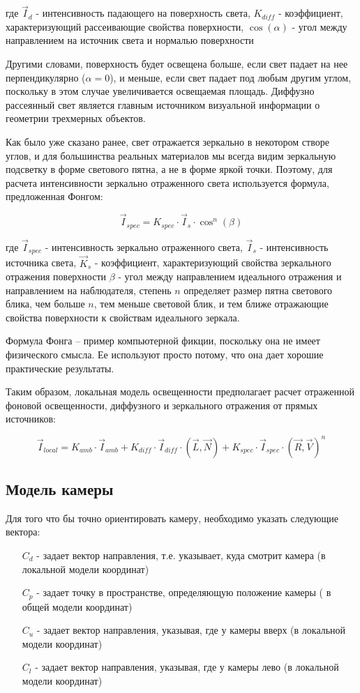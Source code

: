 \documentclass[12pt, a4paper]{article}
\begin{document}
где $\vec{I}_{d}$ - интенсивность падающего на поверхность света, $K_{diff}$ - коэффициент, характеризующий рассеивающие свойства поверхности, $\cos(\alpha)$ - угол между направлением на источник света и нормалью поверхности

Другими словами, поверхность будет освещена больше, если свет падает на нее перпендикулярно ($\alpha = 0$), и меньше, если свет падает под любым другим углом, поскольку в этом случае увеличивается освещаемая площадь. Диффузно рассеянный свет является главным источником визуальной информации о геометрии трехмерных объектов.

Как было уже сказано ранее, свет отражается зеркально в некотором створе углов, и для большинства реальных материалов мы всегда видим зеркальную подсветку в форме светового пятна, а не в форме яркой точки. Поэтому, для расчета интенсивности зеркально отраженного света используется формула, предложенная Фонгом:

$$
 \vec{I}_{spec} = K_{spec} \cdot \vec{I}_{s} \cdot \cos^n(\beta)
$$

где $\vec{I}_{spec}$ - интенсивность зеркально отраженного света,  $\vec{I}_{s}$ - интенсивность источника света,  $\vec{K}_{s}$ - коэффициент, характеризующий свойства зеркального отражения поверхности
$\beta$ - угол между направлением идеального отражения и направлением на наблюдателя, степень $n$ определяет размер пятна светового блика, чем больше $n$, тем меньше световой блик, и тем ближе отражающие свойства поверхности к свойствам идеального зеркала.

Формула Фонга – пример компьютерной фикции, поскольку она не имеет физического смысла. Ее используют просто потому, что она дает хорошие практические результаты. 

Таким образом, локальная модель освещенности предполагает расчет отраженной фоновой освещенности, диффузного и зеркального отражения от прямых источников: 

$$
 \vec{I}_{local} =  K_{amb} \cdot \vec{I}_{amb} +  K_{diff} \cdot \vec{I}_{diff} \cdot \left( \vec{L},\vec{N} \right) + K_{spec} \cdot \vec{I}_{spec} \cdot \left( \vec{R},\vec{V} \right)^n
$$


\subsection{Модель камеры}

Для того что бы точно ориентировать камеру, необходимо указать следующие вектора:
\begin{itemize}
\item[$C_d$] - задает вектор направления, т.е. указывает, куда смотрит камера (в локальной модели координат)
\item[$C_p$] - задает точку в пространстве, определяющую положение камеры ( в общей модели координат)
\item[$C_u$] - задает вектор направления, указывая, где у камеры вверх (в локальной модели координат)
\item[$C_l$] - задает вектор направления, указывая, где у камеры лево (в локальной модели координат)
\end{itemize}
\end{document}
